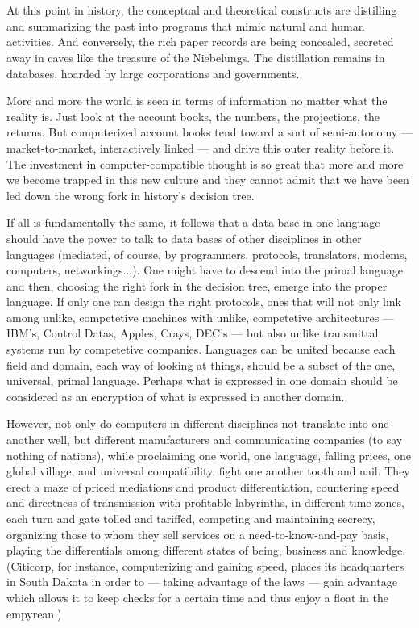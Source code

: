 \chapter{}

At this point in history, the conceptual
and theoretical constructs are distilling and
summarizing the past into programs that
mimic natural and human activities. And
conversely, the rich paper records are being
concealed, secreted away in caves like the
treasure of the Niebelungs. The distillation
remains in databases,
hoarded by large corporations and governments.

More and more the world is seen in terms
of information no matter what the reality is.
Just look at the account books, the numbers,
the projections, the returns. But computerized account books tend toward a sort of
semi-autonomy --- market-to-market, interactively linked --- and drive this outer reality
before it. The investment in computer-compatible thought is so great that more and
more we become trapped in this new culture
and they cannot admit that we have been led
down the wrong fork in history's decision
tree.

If all is fundamentally the same, it follows
that a data base in one language should have
the power to talk to data bases of other
disciplines in other languages (mediated, of
course, by programmers, protocols, translators, modems, computers, networkings...).
One might have to descend into the primal
language and then, choosing the right fork in
the decision tree, emerge into the proper
language. If only one can design the right
protocols, ones that will not only link among
unlike, competetive machines with unlike,
competetive architectures --- IBM's,
Control Datas, Apples, Crays, DEC's --- but also unlike
transmittal systems run by competetive companies. Languages can be united because
each field and domain, each way of looking at things,
should be a subset of the one,
universal, primal language. Perhaps what is
expressed in one domain should be considered as an encryption of what is expressed
in another domain.

However, not only do computers in different disciplines not translate into one
another well, but different manufacturers
and communicating companies (to say nothing of nations), while proclaiming one world,
one language, falling prices, one global village, and universal compatibility, fight one
another tooth and nail. They erect a maze of priced mediations and product differentiation,
countering speed and directness of transmission with profitable labyrinths, in
different time-zones, each turn and gate
tolled and tariffed, competing and maintaining secrecy, organizing those to whom they
sell services on a need-to-know-and-pay
basis, playing the differentials among different states of being, business and knowledge. (Citicorp, for instance, computerizing
and gaining speed, places its headquarters in South Dakota in order to --- taking 
advantage of the laws --- gain advantage which allows it to keep checks for a certain time and
thus enjoy a float in the empyrean.)

